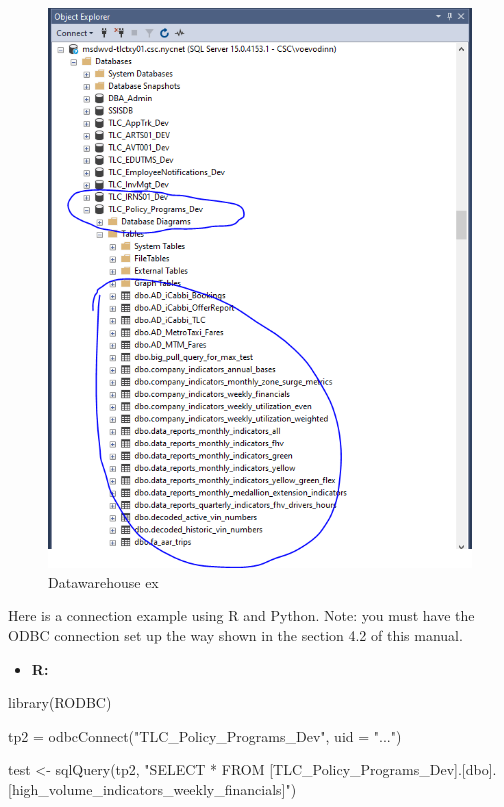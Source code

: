 \documentclass[
]{book}
\newenvironment{Shaded}{\begin{snugshade}}{\end{snugshade}}
\newcommand{\AttributeTok}[1]{\textcolor[rgb]{0.77,0.63,0.00}{#1}}
\newcommand{\FunctionTok}[1]{\textcolor[rgb]{0.00,0.00,0.00}{#1}}
\newcommand{\NormalTok}[1]{#1}
\newcommand{\OtherTok}[1]{\textcolor[rgb]{0.56,0.35,0.01}{#1}}
\newcommand{\StringTok}[1]{\textcolor[rgb]{0.31,0.60,0.02}{#1}}
\providecommand{\tightlist}{%
  \setlength{\itemsep}{0pt}\setlength{\parskip}{0pt}}
\begin{document}
\begin{figure}
\centering
\includegraphics{my_files/dw1.png}
\caption{Datawarehouse ex}
\end{figure}

Here is a connection example using R and Python. Note: you must have the ODBC connection set up the way shown in the section 4.2 of this manual.

\begin{itemize}
\tightlist
\item
  \textbf{R:}
\end{itemize}

\begin{Shaded}
\begin{Highlighting}[]
\FunctionTok{library}\NormalTok{(RODBC)}

\NormalTok{tp2 }\OtherTok{=} \FunctionTok{odbcConnect}\NormalTok{(}\StringTok{"TLC\_Policy\_Programs\_Dev"}\NormalTok{, }\AttributeTok{uid =} \StringTok{"..."}\NormalTok{)}

\NormalTok{test }\OtherTok{\textless{}{-}} \FunctionTok{sqlQuery}\NormalTok{(tp2,}
                 \StringTok{"SELECT * }
\StringTok{                 FROM [TLC\_Policy\_Programs\_Dev].[dbo].[high\_volume\_indicators\_weekly\_financials]"}\NormalTok{)}
\end{Highlighting}
\end{Shaded}
\end{document}
